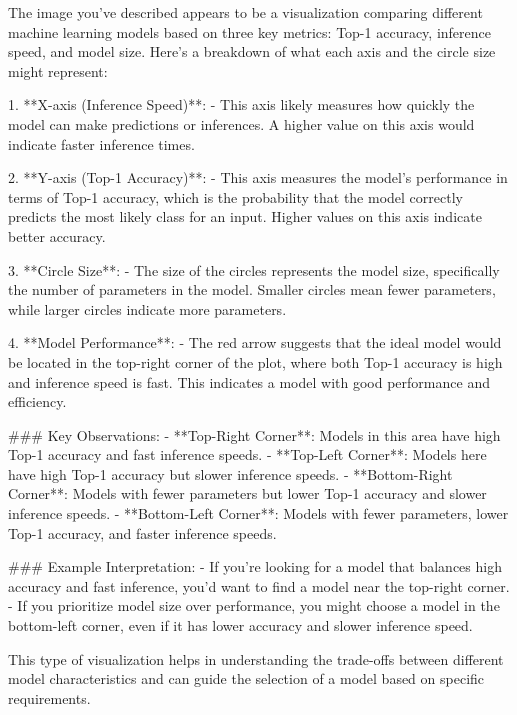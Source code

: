 The image you've described appears to be a visualization comparing different machine learning models based on three key metrics: Top-1 accuracy, inference speed, and model size. Here's a breakdown of what each axis and the circle size might represent:

1. **X-axis (Inference Speed)**:
   - This axis likely measures how quickly the model can make predictions or inferences. A higher value on this axis would indicate faster inference times.

2. **Y-axis (Top-1 Accuracy)**:
   - This axis measures the model's performance in terms of Top-1 accuracy, which is the probability that the model correctly predicts the most likely class for an input. Higher values on this axis indicate better accuracy.

3. **Circle Size**:
   - The size of the circles represents the model size, specifically the number of parameters in the model. Smaller circles mean fewer parameters, while larger circles indicate more parameters.

4. **Model Performance**:
   - The red arrow suggests that the ideal model would be located in the top-right corner of the plot, where both Top-1 accuracy is high and inference speed is fast. This indicates a model with good performance and efficiency.

### Key Observations:
- **Top-Right Corner**: Models in this area have high Top-1 accuracy and fast inference speeds.
- **Top-Left Corner**: Models here have high Top-1 accuracy but slower inference speeds.
- **Bottom-Right Corner**: Models with fewer parameters but lower Top-1 accuracy and slower inference speeds.
- **Bottom-Left Corner**: Models with fewer parameters, lower Top-1 accuracy, and faster inference speeds.

### Example Interpretation:
- If you're looking for a model that balances high accuracy and fast inference, you'd want to find a model near the top-right corner.
- If you prioritize model size over performance, you might choose a model in the bottom-left corner, even if it has lower accuracy and slower inference speed.

This type of visualization helps in understanding the trade-offs between different model characteristics and can guide the selection of a model based on specific requirements.